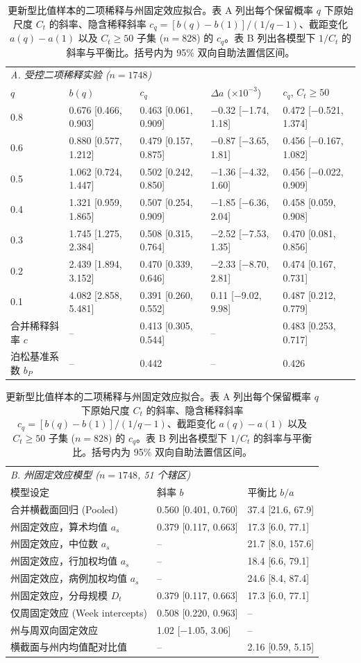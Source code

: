 \begin{table}[htbp]
\centering
\footnotesize
\setlength{\tabcolsep}{4pt}
\caption{更新型比值样本的二项稀释与州固定效应拟合。表 A 列出每个保留概率 $q$ 下原始尺度 $C_t$ 的斜率、隐含稀释斜率 $c_q=[b(q)-b(1)]/(1/q-1)$、截距变化 $a(q)-a(1)$ 以及 $C_t\ge50$ 子集 ($n=828$) 的 $c_q$。表 B 列出各模型下 $1/C_t$ 的斜率与平衡比。括号内为 95\% 双向自助法置信区间。}
\label{tab:s11}
\begin{tabular}{lllll}
\toprule
\multicolumn{5}{l}{\textit{A. 受控二项稀释实验 ($n=1748$)}}\\
$q$ & $b(q)$ & $c_q$ & $\Delta a$ ($\times10^{-3}$) & $c_q$, $C_t\ge50$ \\
\midrule
0.8 & 0.676 [0.466, 0.903] & 0.463 [0.061, 0.909] & $-$0.32 [$-$1.74, 1.18] & 0.472 [$-$0.521, 1.374] \\
0.6 & 0.880 [0.577, 1.212] & 0.479 [0.157, 0.875] & $-$0.87 [$-$3.65, 1.81] & 0.456 [$-$0.167, 1.082] \\
0.5 & 1.062 [0.724, 1.447] & 0.502 [0.242, 0.850] & $-$1.36 [$-$4.32, 1.60] & 0.456 [$-$0.022, 0.909] \\
0.4 & 1.321 [0.959, 1.865] & 0.507 [0.254, 0.909] & $-$1.85 [$-$6.36, 2.04] & 0.458 [0.059, 0.908] \\
0.3 & 1.745 [1.275, 2.384] & 0.508 [0.315, 0.764] & $-$2.52 [$-$7.53, 1.35] & 0.470 [0.081, 0.856] \\
0.2 & 2.439 [1.894, 3.152] & 0.470 [0.339, 0.646] & $-$2.33 [$-$8.70, 2.81] & 0.474 [0.167, 0.731] \\
0.1 & 4.082 [2.858, 5.481] & 0.391 [0.260, 0.552] & 0.11 [$-$9.02, 9.98] & 0.487 [0.212, 0.779] \\
\midrule
合并稀释斜率 $c$ & -- & 0.413 [0.305, 0.544] & -- & 0.483 [0.253, 0.717] \\
泊松基准系数 $b_P$ & -- & 0.442 & -- & 0.426 \\
\bottomrule
\end{tabular}

\bigskip
\begin{tabular}{lll}
\toprule
\multicolumn{3}{l}{\textit{B. 州固定效应模型 ($n=1748$, 51 个辖区)}}\\
模型设定 & 斜率 $b$ & 平衡比 $b/a$ \\
\midrule
合并横截面回归 (Pooled) & 0.560 [0.401, 0.760] & 37.4 [21.6, 67.9] \\
州固定效应，算术均值 $a_s$ & 0.379 [0.117, 0.663] & 17.3 [6.0, 77.1] \\
州固定效应，中位数 $a_s$ & -- & 21.7 [8.0, 157.6] \\
州固定效应，行加权均值 $a_s$ & -- & 18.4 [6.6, 79.1] \\
州固定效应，病例加权均值 $a_s$ & -- & 24.6 [8.4, 87.4] \\
州固定效应，分母规模 $D_t$ & 0.379 [0.117, 0.663] & 17.3 [6.0, 77.1] \\
仅周固定效应 (Week intercepts) & 0.508 [0.220, 0.963] & -- \\
州与周双向固定效应 & 1.02 [$-$1.05, 3.06] & -- \\
横截面与州内均值配对比值 & -- & 2.16 [0.59, 5.15] \\
\bottomrule
\end{tabular}
\end{table}
